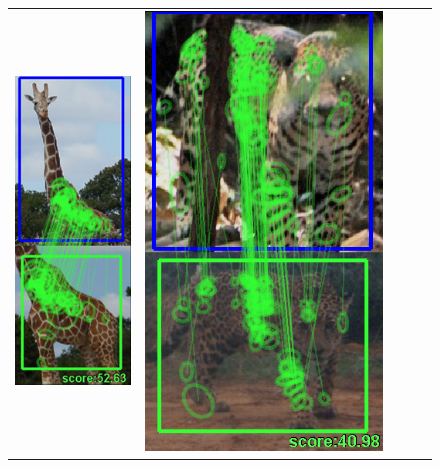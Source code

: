 \begin{figure}
\begin{center}
\begin{tabular}{c c c c c}
\includegraphics[height=\correctmatchheight]{figures/FinalImages/cropped/GIR_correct_27_cropped2}
&
\includegraphics[height=\correctmatchheight]{figures/FinalImages/cropped/JAG_correct_31_cropped}

\end{tabular}
\end{center}
\end{figure}
